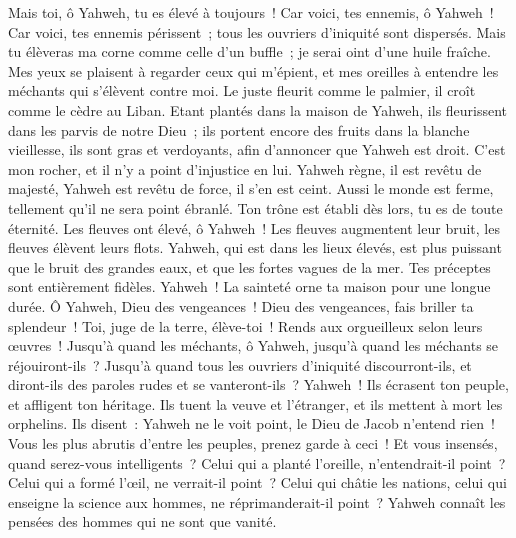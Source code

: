\begin{multicols}{2}
Mais toi, ô Yahweh, tu es élevé à toujours~!
Car voici, tes ennemis, ô Yahweh~! Car voici, tes ennemis périssent~; tous les ouvriers d'iniquité sont dispersés.
Mais tu élèveras ma corne comme celle d'un buffle~; je serai oint d'une huile fraîche.
Mes yeux se plaisent à regarder ceux qui m'épient, et mes oreilles à entendre les méchants qui s'élèvent contre moi.
Le juste fleurit comme le palmier, il croît comme le cèdre au Liban.
Etant plantés dans la maison de Yahweh, ils fleurissent dans les parvis de notre Dieu~;
ils portent encore des fruits dans la blanche vieillesse, ils sont gras et verdoyants,
afin d'annoncer que Yahweh est droit. C'est mon rocher, et il n'y a point d'injustice en lui.
\VerseOne{}Yahweh règne, il est revêtu de majesté, Yahweh est revêtu de force, il s'en est ceint. Aussi le monde est ferme, tellement qu'il ne sera point ébranlé.
Ton trône est établi dès lors, tu es de toute éternité.
Les fleuves ont élevé, ô Yahweh~! Les fleuves augmentent leur bruit, les fleuves élèvent leurs flots.
Yahweh, qui est dans les lieux élevés, est plus puissant que le bruit des grandes eaux, et que les fortes vagues de la mer.
Tes préceptes sont entièrement fidèles. Yahweh~! La sainteté orne ta maison pour une longue durée.
\VerseOne{}Ô Yahweh, Dieu des vengeances~! Dieu des vengeances, fais briller ta splendeur~!
Toi, juge de la terre, élève-toi~! Rends aux orgueilleux selon leurs œuvres~!
Jusqu'à quand les méchants, ô Yahweh, jusqu'à quand les méchants se réjouiront-ils~?
Jusqu'à quand tous les ouvriers d'iniquité discourront-ils, et diront-ils des paroles rudes et se vanteront-ils~?
Yahweh~! Ils écrasent ton peuple, et affligent ton héritage.
Ils tuent la veuve et l'étranger, et ils mettent à mort les orphelins.
Ils disent~: Yahweh ne le voit point, le Dieu de Jacob n'entend rien~!
Vous les plus abrutis d'entre les peuples, prenez garde à ceci~! Et vous insensés, quand serez-vous intelligents~?
Celui qui a planté l'oreille, n'entendrait-il point~? Celui qui a formé l'œil, ne verrait-il point~?
Celui qui châtie les nations, celui qui enseigne la science aux hommes, ne réprimanderait-il point~?
Yahweh connaît les pensées des hommes qui ne sont que vanité.

\end{multicols}
